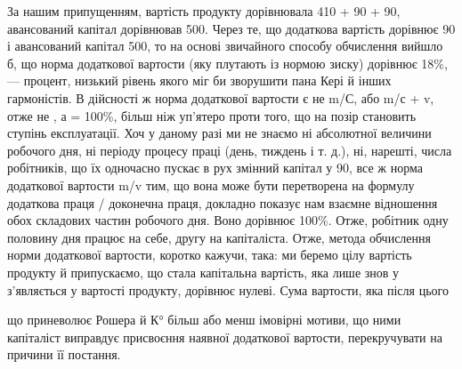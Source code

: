 За нашим припущенням, вартість продукту дорівнювала 410 + 90 +
90,
авансований капітал дорівнював 500. Через те, що додаткова вартість дорівнює 90 і
авансований капітал 500, то на основі звичайного способу обчислення вийшло б, що норма
додаткової вартости (яку плутають із нормою зиску) дорівнює 18\%, — процент, низький рівень якого міг
би зворушити пана Кері й інших гармоністів. В дійсності ж норма додаткової вартости є не m/С, або
m/с + v, отже не , а  = 100\%, більш ніж уп’ятеро проти того, що на позір становить
ступінь експлуатації. Хоч у даному разі ми не знаємо ні абсолютної величини робочого дня, ні періоду
процесу праці (день, тиждень і т. д.), ні, нарешті, числа робітників, що їх одночасно пускає в рух
змінний капітал у 90, все ж норма додаткової вартости m/v тим, що вона може бути
перетворена на формулу
додаткова праця / доконечна праця, докладно показує нам взаємне відношення обох складових частин
робочого дня. Воно дорівнює 100\%. Отже, робітник одну половину дня працює на себе, другу на
капіталіста. Отже, метода обчислення норми додаткової вартости, коротко
кажучи, така: ми беремо цілу вартість продукту й припускаємо, що стала капітальна вартість, яка лише
знов у з’являється у вартості продукту, дорівнює нулеві. Сума вартости, яка після цього

що приневолює Рошера й К° більш або менш імовірні мотиви, що ними капіталіст виправдує присвоєння
наявної додаткової вартости, перекручувати на причини її постання.
\parbreak{}  %
